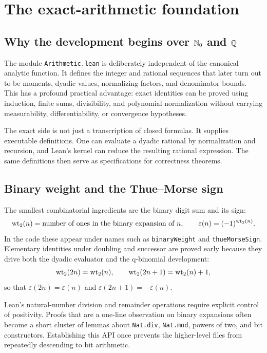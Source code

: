 \documentclass[11pt,oneside]{article}
\theoremstyle{definition}
\theoremstyle{remark}
\begin{document}
\section{The exact-arithmetic foundation}\label{ch:arithmetic}

\subsection{Why the development begins over \texorpdfstring{\(\mathbb{N}_{0}\) and \(\mathbb{Q}\)}{N and Q}}
The module \nolinkurl{Arithmetic.lean} is deliberately independent of the canonical analytic function.  It defines the integer and rational sequences that later turn out to be moments, dyadic values, normalizing factors, and denominator bounds.  This has a profound practical advantage: exact identities can be proved using induction, finite sums, divisibility, and polynomial normalization without carrying measurability, differentiability, or convergence hypotheses.

The exact side is not just a transcription of closed formulas.  It supplies executable definitions.  One can evaluate a dyadic rational by normalization and recursion, and Lean's kernel can reduce the resulting rational expression.  The same definitions then serve as specifications for correctness theorems.

\subsection{Binary weight and the Thue--Morse sign}
The smallest combinatorial ingredients are the binary digit sum and its sign:
\[
  \operatorname{wt}_{2}(n)=\text{number of ones in the binary expansion of }n,
  \qquad
  \varepsilon(n)=(-1)^{\operatorname{wt}_{2}(n)}.
\]
In the code these appear under names such as \nolinkurl{binaryWeight} and \nolinkurl{thueMorseSign}.  Elementary identities under doubling and successor are proved early because they drive both the dyadic evaluator and the q-binomial development:
\[
  \operatorname{wt}_{2}(2n)=\operatorname{wt}_{2}(n),
  \qquad
  \operatorname{wt}_{2}(2n+1)=\operatorname{wt}_{2}(n)+1,
\]
so that \(\varepsilon(2n)=\varepsilon(n)\) and \(\varepsilon(2n+1)=-\varepsilon(n)\).

Lean's natural-number division and remainder operations require explicit control of positivity.  Proofs that are a one-line observation on binary expansions often become a short cluster of lemmas about \nolinkurl{Nat.div}, \nolinkurl{Nat.mod}, powers of two, and bit constructors.  Establishing this API once prevents the higher-level files from repeatedly descending to bit arithmetic.
\end{document}
